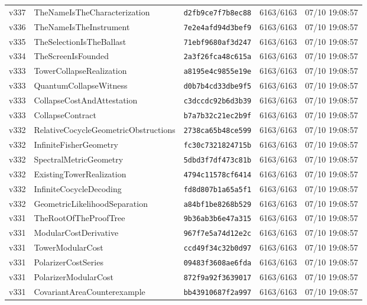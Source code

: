 \documentclass[11pt]{article}
\theoremstyle{definition}\newtheorem{deriv}{Derivação}
\begin{document}
{\begin{longtable}{@{}lllll@{}}
v337 & TheNameIsTheCharacterization & \texttt{d2fb9ce7f7b8ec88} & 6163/6163 & 07/10 19:08:57 \\
v336 & TheNameIsTheInstrument & \texttt{7e2e4afd94d3bef9} & 6163/6163 & 07/10 19:08:57 \\
v335 & TheSelectionIsTheBallast & \texttt{71ebf9680af3d247} & 6163/6163 & 07/10 19:08:57 \\
v334 & TheScreenIsFounded & \texttt{2a3f26fca48c615a} & 6163/6163 & 07/10 19:08:57 \\
v333 & TowerCollapseRealization & \texttt{a8195e4c9855e19e} & 6163/6163 & 07/10 19:08:57 \\
v333 & QuantumCollapseWitness & \texttt{d0b7b4cd33dbe9f5} & 6163/6163 & 07/10 19:08:57 \\
v333 & CollapseCostAndAttestation & \texttt{c3dccdc92b6d3b39} & 6163/6163 & 07/10 19:08:57 \\
v333 & CollapseContract & \texttt{b7a7b32c21ec2b9f} & 6163/6163 & 07/10 19:08:57 \\
v332 & RelativeCocycleGeometricObstructions & \texttt{2738ca65b48ce599} & 6163/6163 & 07/10 19:08:57 \\
v332 & InfiniteFisherGeometry & \texttt{fc30c7321824715b} & 6163/6163 & 07/10 19:08:57 \\
v332 & SpectralMetricGeometry & \texttt{5dbd3f7df473c81b} & 6163/6163 & 07/10 19:08:57 \\
v332 & ExistingTowerRealization & \texttt{4794c11578cf6414} & 6163/6163 & 07/10 19:08:57 \\
v332 & InfiniteCocycleDecoding & \texttt{fd8d807b1a65a5f1} & 6163/6163 & 07/10 19:08:57 \\
v332 & GeometricLikelihoodSeparation & \texttt{a84bf1be8268b529} & 6163/6163 & 07/10 19:08:57 \\
v331 & TheRootOfTheProofTree & \texttt{9b36ab3b6e47a315} & 6163/6163 & 07/10 19:08:57 \\
v331 & ModularCostDerivative & \texttt{967f7e5a74d12e2c} & 6163/6163 & 07/10 19:08:57 \\
v331 & TowerModularCost & \texttt{ccd49f34c32b0d97} & 6163/6163 & 07/10 19:08:57 \\
v331 & PolarizerCostSeries & \texttt{09483f3608ae6fda} & 6163/6163 & 07/10 19:08:57 \\
v331 & PolarizerModularCost & \texttt{872f9a92f3639017} & 6163/6163 & 07/10 19:08:57 \\
v331 & CovariantAreaCounterexample & \texttt{bb43910687f2a997} & 6163/6163 & 07/10 19:08:57 \\

\end{longtable}}
\end{document}
